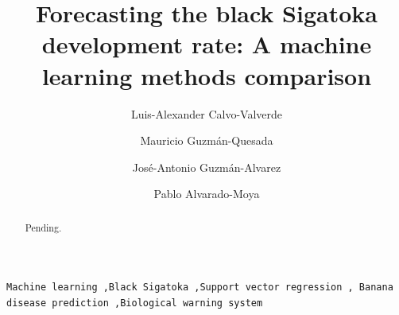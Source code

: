 \documentclass[review]{elsarticle}
\begin{document}
\begin{frontmatter}

\title{Forecasting the black Sigatoka development rate: A machine learning methods comparison 
}

\author[afiLuisAlex]{Luis-Alexander Calvo-Valverde}

\author[afiCorbana] {Mauricio Guzm\'an-Quesada}
\author[afiCorbana]{Jos\'e-Antonio Guzm\'an-Alvarez}
\author[afiPablo]{Pablo Alvarado-Moya}

\address[afiLuisAlex]{DOCINADE, Instituto Tecnol\'ogico de Costa Rica, 
Computer Research Center, Multidisciplinar program eScience, 
CNCA/CeNAT, Cartago, Costa Rica}

\address[afiCorbana]{Direcci\'on de Investigaciones, Corporaci\'on Bananera Nacional S.A., Gu\'apiles, Costa Rica}

\address[afiPablo]{DOCINADE, Instituto Tecnol\'ogico de Costa Rica, Cartago, Costa Rica}




\begin{abstract}
Pending.
\end{abstract}

\begin{keyword}
\texttt{Machine learning \sep Black Sigatoka \sep Support vector regression \sep
Banana disease prediction \sep Biological warning system }
\end{keyword}

\end{frontmatter}

\linenumbers
\end{document}
